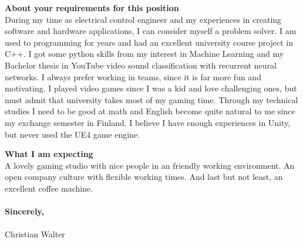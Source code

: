 \documentclass{article}
\newcommand{\mySubTitle}[1]{{\fontfamily{ffm}\selectfont \textbf{\large{#1}} }}
\newcommand{\headParam}[1]{{\normalfont \selectfont \textbf{\large{#1}} }}
\begin{document}
\headParam{About your requirements for this position}
\\
During my time as electrical control engineer and my experiences in creating software and hardware applications, I can consider myself a problem solver. I am used to programming for years and had an excellent university course project in C++. I got some python skills from my interest in Machine Learning and my Bachelor thesis in YouTube video sound classification with recurrent neural networks. I always prefer working in teams, since it is far more fun and motivating. I played video games since I was a kid and love challenging ones, but must admit that university takes most of my gaming time. Through my technical studies I need to be good at math and English become quite natural to me since my exchange semester in Finland. I believe I have enough experiences in Unity, but never used the UE4 game engine. 

\headParam{What I am expecting}
\\
A lovely gaming studio with nice people in an friendly working environment. An open company culture with flexible working times. And last but not least, an excellent coffee machine.
\\ \\
\mySubTitle{Sincerely,}\\\\ Christian Walter
\end{document}
